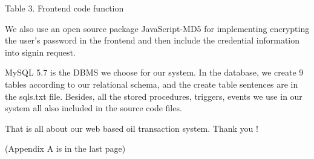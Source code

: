 \documentclass[12pt,a4paper]{report}
\begin{document}
\begin{mypara}
\begin{center}
    Table 3. Frontend code function
  \end{center}
  \par
  We also use an open source package JavaScript-MD5 for implementing encrypting the user's password in the frontend and then include the credential information into signin request.
  \par
  MySQL 5.7 is the DBMS we choose for our system. In the database, we create 9 tables according to our relational schema, and the create table sentences are in the sqls.txt file. Besides, all the stored procedures, triggers, events we use in our system all also included in the source code files.
  \par
  That is all about our web based oil transaction system. Thank you !
  \par
  (Appendix A is in the last page)
\end{mypara}
\clearpage
\end{document}
